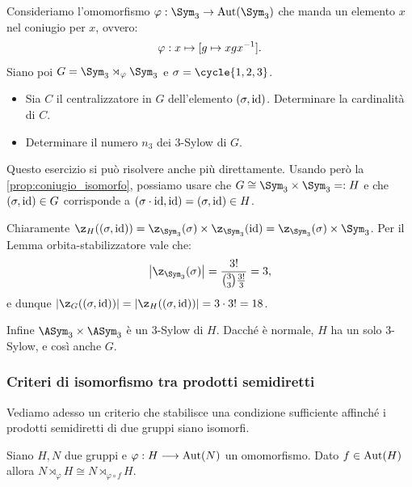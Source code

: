 \documentclass[11pt]{scrartcl}
\begin{document}
	\begin{exercise}
		Consideriamo l'omomorfismo $\varphi : \Sym_3 \to \Aut(\Sym_3)$ che manda
		un elemento $x$ nel coniugio per $x$, ovvero:
		\[ \varphi : x \mapsto [g \mapsto xgx^{-1}]. \]
		Siano poi $G = \Sym_3 \rtimes_\varphi \Sym_3$ e $\sigma = \cycle{1, 2, 3}$.
		
		\begin{itemize}
			\item Sia $C$ il centralizzatore in $G$ dell'elemento $(\sigma, \mathrm{id})$.
			Determinare la cardinalità di $C$.
			\item Determinare il numero $n_3$ dei $3$-Sylow di $G$.
		\end{itemize}
	\end{exercise}
	
	\begin{soln}
		Questo esercizio si può risolvere anche più direttamente. Usando
		però la \autoref{prop:coniugio_isomorfo}, possiamo usare che
		$G \cong \Sym_3 \times \Sym_3 =: H$ e che $(\sigma, \mathrm{id}) \in G$ corrisponde
		a $(\sigma \cdot \mathrm{id}, \mathrm{id}) = (\sigma, \mathrm{id}) \in H$. \medskip
		
		Chiaramente
		$\z_H((\sigma, \id)) = \z_{\Sym_3}(\sigma) \times \z_{\Sym_3}(\id) =
		\z_{\Sym_3}(\sigma) \times \Sym_3$. Per il Lemma orbita-stabilizzatore
		vale che:
		\[ \abs{\z_{\Sym_3}(\sigma)} = \frac{3!}{\binom{3}{3} \frac{3!}{3}} = 3, \]
		e dunque $\abs{\z_G((\sigma, \id))} = \abs{\z_H((\sigma, \id))} = 3 \cdot 3! = 18$. \medskip
		
		
		Infine $\ASym_3 \times \ASym_3$ è un $3$-Sylow di $H$. Dacché
		è normale, $H$ ha un solo $3$-Sylow, e così anche $G$.
	\end{soln}
	
	\subsubsection{Criteri di isomorfismo tra prodotti semidiretti}
	
	Vediamo adesso un criterio che stabilisce una condizione sufficiente affinché 
	i prodotti semidiretti di due gruppi siano isomorfi.
	
	\begin{proposition}
		\label{prop1.74}
		Siano $H, N$ due gruppi e $\varphi: H \longrightarrow \operatorname{Aut}(N)$ un omomorfismo.
		Dato $f \in \operatorname{Aut}(H)$ allora $N\rtimes_{\varphi} H \cong N\rtimes_{\varphi\circ f} H$.
	\end{proposition}
	
\end{document}
